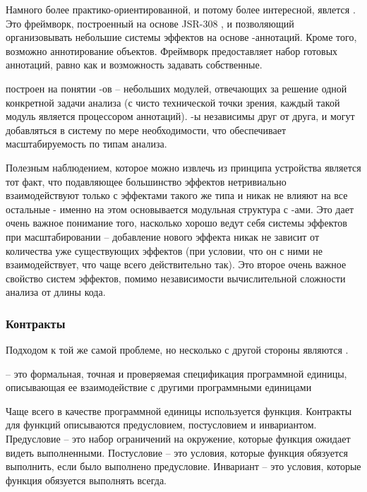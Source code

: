 Намного более практико-ориентированной, и потому более интересной, явлется  \cite{checker-framework}. Это фреймворк, построенный на основе JSR-308 \cite{JSR308}, и позволяющий организовывать небольшие системы эффектов на основе -аннотаций. Кроме того, возможно аннотирование объектов. Фреймворк предоставляет набор готовых аннотаций, равно как и возможность задавать собственные.

 построен на понятии -ов -- небольших модулей, отвечающих за решение одной конкретной задачи анализа (с чисто технической точки зрения, каждый такой модуль является процессором аннотаций). -ы независимы друг от друга, и могут добавляться в систему по мере необходимости, что обеспечивает масштабируемость по типам анализа.

Полезным наблюдением, которое можно извлечь из принципа устройства  является тот факт, что подавляющее большинство эффектов нетривиально взаимодействуют только с эффектами такого же типа и никак не влияют на все остальные - именно на этом основывается модульная структура с -ами. Это дает очень важное понимание того, насколько хорошо ведут себя системы эффектов при масштабировании -- добавление нового эффекта никак не зависит от количества уже существующих эффектов (при условии, что он с ними не взаимодействует, что чаще всего действительно так). Это второе очень важное свойство систем эффектов, помимо независимости вычислительной сложности анализа от длины кода.








\subsubsection{Контракты}

Подходом к той же самой проблеме, но несколько с другой стороны являются .

\begin{definition}
	\label{def-contract}
	 -- это формальная, точная и проверяемая спецификация программной единицы, описывающая ее взаимодействие с другими программными единицами \cite{Meyer92}
\end{definition}

Чаще всего в качестве программной единицы используется функция. Контракты для функций описываются предусловием, постусловием и инвариантом. Предусловие -- это набор ограничений на окружение, которые функция ожидает видеть выполненными. Постусловие -- это условия, которые функция обязуется выполнить, если было выполнено предусловие. Инвариант -- это условия, которые функция обязуется выполнять всегда.

